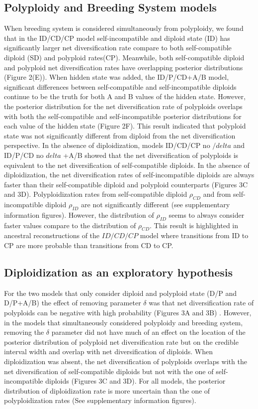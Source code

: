 \subsection{Polyploidy and Breeding System models}
When breeding system is considered simultaneously from polyploidy, we found that in the ID/CD/CP model self-incompatible and diploid state (ID) has significantly larger net diversification rate compare to both self-compatible diploid (SD) and polyploid rates(CP). Meanwhile, both self-compatible diploid and polyploid net diversification rates have overlapping posterior distributions (Figure 2(E)). When hidden state was added, the ID/P/CD+A/B model, significant differences between self-compatible and self-incompatible diploids continue to be the truth for both A and B values of the hidden state. However, the posterior distribution for the net diversification rate of polyploids overlaps with both the self-compatible and self-incompatible posterior distributions for each value of the hidden state (Figure 2F). This result indicated that polyploid state was not significantly different from diploid from the net diversification perspective.  In the absence of diploidization, models ID/CD/CP no $/delta$ and ID/P/CD no $delta$ +A/B showed that the net diversification of polyploids is equivalent to the net diversification of self-compatible diploids. In the absence of diploidization, the net diversification rates of self-incompatible diploids are always faster than their self-compatible diploid and polyploid counterparts (Figures 3C and 3D). \newline
Polyploidization rates from self-compatible diploid $\rho_{CD}$ and from self-incompatible diploid $\rho_{ID}$ are not significantly different (see supplementary information figures). However, the distribution of $\rho_{ID}$ seems to always consider faster values compare to the distribution of $\rho_{CD}$. This result is highlighted in ancestral reconstructions of the $ID/CD/CP$ model where transitions from ID to CP are more probable than transitions from CD to CP. %


\subsection{Diploidization as an exploratory hypothesis}
 For the two models that only consider diploid and polyploid state (D/P and D/P+A/B) the effect of removing parameter $\delta$ was that net diversification rate of polyploids can be negative with high probability (Figures 3A and 3B) . However, in the models that simultaneously considered polyploidy and breeding system, removing the $\delta$ parameter did not have much of an effect on the location of the posterior distribution of polyploid net diversification rate but on the credible interval width and overlap with net diversification of diploids.  When diploidization was absent, the net diversification of polyploids overlaps with the net diversification of self-compatible diploids but not with the one of self-incompatible diploids (Figures 3C and 3D).  For all models, the posterior distribution of diploidization rate is more uncertain than the one of polyploidization rates (See supplementary information figures). 
 

